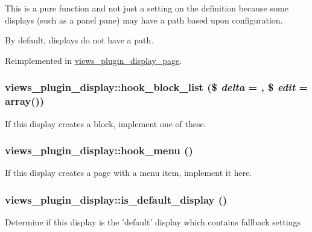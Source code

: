 This is a pure function and not just a setting on the definition because some displays (such as a panel pane) may have a path based upon configuration.

By default, displays do not have a path. 

Reimplemented in \hyperlink{classviews__plugin__display__page_a6ab3df375279fc7308aea96e3f08f833}{views\_\-plugin\_\-display\_\-page}.\hypertarget{classviews__plugin__display_a9b3fa020af70a4ae0b36742f6f5b1171}{
\subsubsection[{hook\_\-block\_\-list}]{\setlength{\rightskip}{0pt plus 5cm}views\_\-plugin\_\-display::hook\_\-block\_\-list (\$ {\em delta} = {}, \/  \$ {\em edit} = {\ttfamily array()})}}
\label{classviews__plugin__display_a9b3fa020af70a4ae0b36742f6f5b1171}
If this display creates a block, implement one of these. \hypertarget{classviews__plugin__display_af81f784641ab255c20044ef3e70efd1d}{
\subsubsection[{hook\_\-menu}]{\setlength{\rightskip}{0pt plus 5cm}views\_\-plugin\_\-display::hook\_\-menu ()}}
\label{classviews__plugin__display_af81f784641ab255c20044ef3e70efd1d}
If this display creates a page with a menu item, implement it here. \hypertarget{classviews__plugin__display_a4f4562c1d689d8d3494b78d676249732}{
\subsubsection[{is\_\-default\_\-display}]{\setlength{\rightskip}{0pt plus 5cm}views\_\-plugin\_\-display::is\_\-default\_\-display ()}}
\label{classviews__plugin__display_a4f4562c1d689d8d3494b78d676249732}
Determine if this display is the 'default' display which contains fallback settings 

